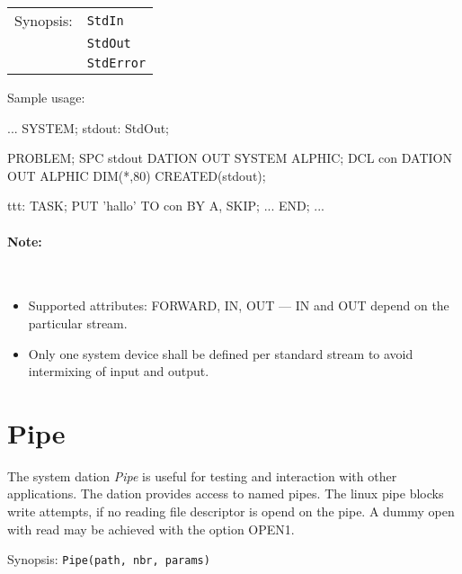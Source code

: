 \begin{tabular}{ll}
Synopsis: & \verb|StdIn| \\
          & \verb|StdOut| \\
          & \verb|StdError| \\
\end{tabular}

Sample usage:
\begin{PEARLCode}
...
SYSTEM;
  stdout: StdOut;

PROBLEM;
   SPC stdout DATION OUT SYSTEM ALPHIC;
   DCL con    DATION OUT ALPHIC DIM(*,80) CREATED(stdout);

ttt: TASK;
   PUT 'hallo' TO con BY A, SKIP;
...
END;
...
\end{PEARLCode}

\paragraph{Note:}\ 
\begin{itemize}
\item Supported attributes: FORWARD, IN, OUT --- IN and OUT depend on the
particular stream.
\item Only one system device shall be defined per standard stream to avoid
intermixing of input and output.
\end{itemize}

\section{Pipe}
The system dation {\em Pipe} is useful for testing and interaction with
other applications. The dation provides access to named pipes.
The linux pipe blocks write attempts, if no reading file descriptor
is opend on the pipe. 
A dummy open with read may be achieved with the option OPEN1.

Synopsis: \verb|Pipe(path, nbr, params)|

